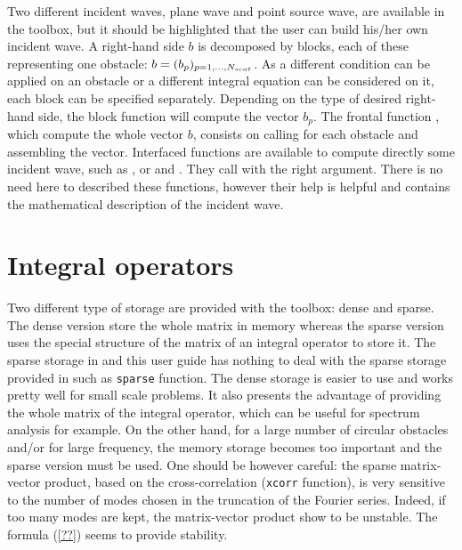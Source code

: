 Two different incident waves, plane wave and point source wave, are available in the \mudiff toolbox, but it should be highlighted that the user can build his/her own incident wave. A right-hand side $b$ is decomposed by blocks, each of these representing one obstacle: $b= (b_p)_{p=1,\ldots,N_{scat}}$. As a different condition can be applied on an obstacle or a different integral equation can be considered on it, each block can be specified separately. Depending on the type of desired right-hand side, the block function  will compute the vector $b_p$. The frontal function , which compute the whole vector $b$, consists on calling   for each obstacle and assembling the vector. Interfaced functions are available to compute directly some incident wave, such as ,  or  and . They call  with the right argument. There is no need here to described these functions, however their help is helpful and contains the mathematical description of the incident wave.

\subsubsection{}







\section{Integral operators}

Two different type of storage are provided with the \mudiff toolbox: dense and sparse. The dense version store the whole matrix in memory whereas the sparse version uses the special structure of the matrix of an integral operator to store it. The sparse storage in \mudiff and this user guide has nothing to deal with the sparse storage provided in \matlab such as \texttt{sparse} function. The dense storage is easier to use and works pretty well for small scale problems. It also presents the advantage of providing the whole matrix of the integral operator, which can be useful for spectrum analysis for example. On the other hand, for a large number of circular obstacles and/or for large frequency, the memory storage becomes too important and the sparse version must be used. One should be however careful: the sparse matrix-vector product, based on the cross-correlation (\texttt{xcorr} \matlab function), is very sensitive to the number of modes chosen in the truncation of the Fourier series. Indeed, if too many modes are kept, the matrix-vector product show to be unstable. The formula (\ref{??}) seems to provide stability.

